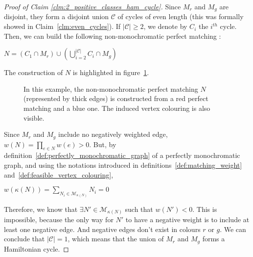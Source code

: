 \begin{proof}[Proof of Claim \ref{clm:2_positive_classes_ham_cycle}]
    Since $M_r$ and $M_g$ are disjoint, they form a disjoint union $\mathcal{C}$ of cycles of even length (this was formally showed in Claim~\ref{clm:even_cycles}).
    If $\left| \mathcal{C} \right| \geq 2$, we denote by $C_i$ the $i^{th}$ cycle.
    Then, we can build the following non-monochromatic perfect matching :
    \begin{center}
        $N = (C_1 \cap M_r) \cup \left(\bigcup\limits_{i=2}^{\left| \mathcal{C} \right|} C_i \cap M_g\right)$
    \end{center}

    The construction of $N$ is highlighted in figure~\ref{fig:demo_unique_neg_ham}.

    \begin{figure}[H]
        \caption{In this example, the non-monochromatic perfect matching $N$ (represented by thick edges) is constructed from a red perfect matching and a blue one. The induced vertex colouring is also visible.}
        \label{fig:demo_unique_neg_ham}
    \end{figure}

    Since $M_r$ and $M_g$ include no negatively weighted edge, $w(N) = \prod\limits_{e \in N} w(e) > 0$.
    But, by definition~\ref{def:perfectly_monochromatic_graph} of a perfectly monochromatic graph, and using the notations introduced in definitions~\ref{def:matching_weight} and~\ref{def:feasible_vertex_colouring},

    \begin{center}
        $w(\kappa(N)) = \sum\limits_{N_i \in \mathcal{M}_{\kappa(N)}} N_i = 0$
    \end{center}

    Therefore, we know that $\exists N' \in \mathcal{M}_{\kappa(N)}$ such that $w(N') < 0$.
    This is impossible, because the only way for $N'$ to have a negative weight is to include at least one negative edge.
    And negative edges don't exist in colours $r$ or $g$.
    We can conclude that $\left| \mathcal{C} \right| = 1$, which means that the union of $M_r$ and $M_g$ forms a Hamiltonian cycle.
\end{proof}

